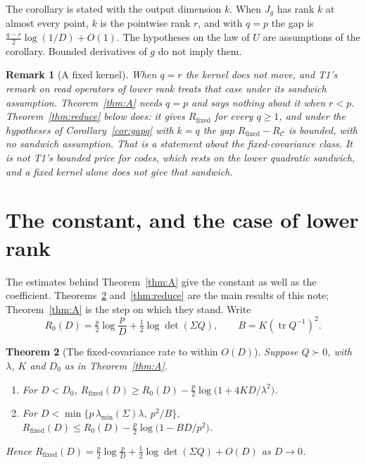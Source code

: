 \documentclass[11pt,onecolumn]{IEEEtran}
\newtheorem{theorem}{Theorem}
\newtheorem{remark}[theorem]{Remark}
\newcommand{\tr}{\operatorname{tr}}
\newcommand{\lmin}{\lambda_{\min}}
\newcommand{\Rfix}{R_{\mathrm{fixed}}}
\newcommand{\RC}{R_{\mathcal C}}
\begin{document}
The corollary is stated with the output dimension $k$. When $J_g$ has rank $k$ at almost
every point, $k$ is the pointwise rank $r$, and with $q=p$ the gap is
$\tfrac{q-r}2\log(1/D)+O(1)$. The hypotheses on the law of $U$ are assumptions of the
corollary. Bounded derivatives of $g$ do not imply them.

\begin{remark}[A fixed kernel]
When $q=r$ the kernel does not move, and T1's remark on read operators of lower rank
treats that case under its sandwich assumption. Theorem~\ref{thm:A} needs $q=p$ and says
nothing about it when $r<p$. Theorem~\ref{thm:reduce} below does: it gives $\Rfix$ for every
$q\ge1$, and under the hypotheses of Corollary~\ref{cor:gapq} with $k=q$ the gap
$\Rfix-\RC$ is bounded, with no sandwich assumption. That is a statement about the
fixed-covariance class. It is not T1's bounded price for codes, which rests on the lower
quadratic sandwich, and a fixed kernel alone does not give that sandwich.
\end{remark}

\section{The constant, and the case of lower rank}\label{sec:sharp}

The estimates behind Theorem~\ref{thm:A} give the constant as well as the coefficient.
Theorems~\ref{thm:sharp} and~\ref{thm:reduce} are the main results of this note;
Theorem~\ref{thm:A} is the step on which they stand.
Write
\[
R_0(D)=\tfrac p2\log\frac pD+\tfrac12\log\det(\Sigma Q),\qquad B=K(\tr Q^{-1})^2 .
\]

\begin{theorem}[The fixed-covariance rate to within $O(D)$]\label{thm:sharp}
Suppose $Q\succ0$, with $\lambda$, $K$ and $D_0$ as in Theorem~\ref{thm:A}.
\begin{enumerate}
\item[(a)] For $D<D_0$,
$\Rfix(D)\ge R_0(D)-\tfrac p2\log\bigl(1+4KD/\lambda^2\bigr)$.
\item[(b)] For $D<\min\{p\,\lmin(\Sigma)\lambda,\ p^2/B\}$,
$\Rfix(D)\le R_0(D)-\tfrac p2\log\bigl(1-BD/p^2\bigr)$.
\end{enumerate}
Hence $\Rfix(D)=\tfrac p2\log\tfrac pD+\tfrac12\log\det(\Sigma Q)+O(D)$ as $D\to0$.
\end{theorem}
\end{document}
